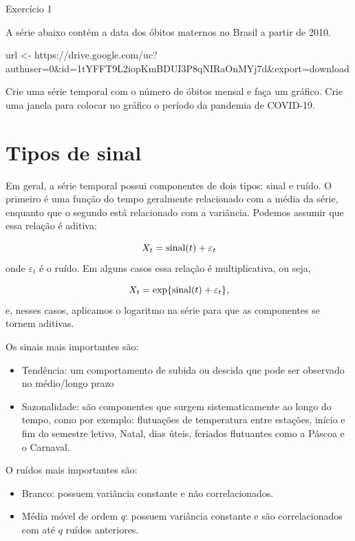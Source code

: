 \documentclass[
  letterpaper,
  DIV=11,
  numbers=noendperiod]{scrreprt}
\newenvironment{Shaded}{\begin{snugshade}}{\end{snugshade}}
\newcommand{\NormalTok}[1]{\textcolor[rgb]{0.00,0.23,0.31}{#1}}
\newcommand{\OtherTok}[1]{\textcolor[rgb]{0.00,0.23,0.31}{#1}}
\newcommand{\StringTok}[1]{\textcolor[rgb]{0.13,0.47,0.30}{#1}}
\begin{document}
Exercício 1

A série abaixo contém a data dos óbitos maternos no Brasil a partir de
2010.

\begin{Shaded}
\begin{Highlighting}[]
\NormalTok{url }\OtherTok{\textless{}{-}} \StringTok{\textquotesingle{}https://drive.google.com/uc?authuser=0\&id=1tYFFT9L2iopKmBDUI3P8qNIRaOnMYj7d\&export=download\textquotesingle{}}
\end{Highlighting}
\end{Shaded}

Crie uma série temporal com o número de óbitos mensal e faça um gráfico.
Crie uma janela para colocar no gráfico o período da pandemia de
COVID-19.


\hypertarget{tipos-de-sinal}{%
\chapter{Tipos de sinal}\label{tipos-de-sinal}}

Em geral, a série temporal possui componentes de dois tipos: sinal e
ruído. O primeiro é uma função do tempo geralmente relacionado com a
média da série, enquanto que o segundo está relacionado com a variância.
Podemos assumir que essa relação é aditiva:

\[X_t=\hbox{sinal}(t)+\varepsilon_t\] onde \(\varepsilon_t\) é o ruído.
Em alguns casos essa relação é multiplicativa, ou seja,

\[X_t=\exp\{\hbox{sinal}(t)+\varepsilon_t\},\] e, nesses casos,
aplicamos o logaritmo na série para que as componentes se tornem
aditivas.

Os sinais mais importantes são:

\begin{itemize}
\item
  Tendência: um comportamento de subida ou descida que pode ser
  observado no médio/longo prazo
\item
  Sazonalidade: são componentes que surgem sistematicamente ao longo do
  tempo, como por exemplo: flutuações de temperatura entre estações,
  início e fim do semestre letivo, Natal, dias úteis, feriados
  flutuantes como a Páscoa e o Carnaval.
\end{itemize}

O ruídos mais importantes são:

\begin{itemize}
\item
  Branco: possuem variância constante e não correlacionados.
\item
  Média móvel de ordem \(q\): possuem variância constante e são
  correlacionados com até \(q\) ruídos anteriores.
\end{itemize}
\end{document}
